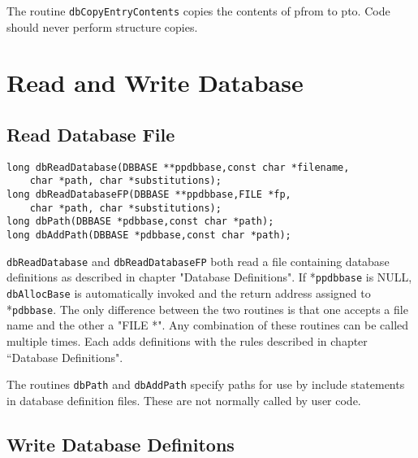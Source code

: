 The routine \verb|dbCopyEntryContents| copies the contents of pfrom to pto. Code should never perform structure copies.

\section{Read and Write Database}

\subsection{Read Database File}

\begin{verbatim}
long dbReadDatabase(DBBASE **ppdbbase,const char *filename,
    char *path, char *substitutions);
long dbReadDatabaseFP(DBBASE **ppdbbase,FILE *fp,
    char *path, char *substitutions);
long dbPath(DBBASE *pdbbase,const char *path);
long dbAddPath(DBBASE *pdbbase,const char *path);
\end{verbatim}
\verb|dbReadDatabase| and \verb|dbReadDatabaseFP| both read a file containing database definitions as described in chapter 
"Database Definitions". If *\verb|ppdbbase| is NULL, \verb|dbAllocBase| is automatically invoked and the return address 
assigned to *\verb|pdbbase|. The only difference between the two routines is that one accepts a file name and the other a 
"FILE *". Any combination of these routines can be called multiple times. Each adds definitions with the rules described 
in chapter ``Database Definitions".

The routines \verb|dbPath| and \verb|dbAddPath| specify paths for use by include statements in database definition files. These are 
not normally called by user code.

\subsection{Write Database Definitons}

